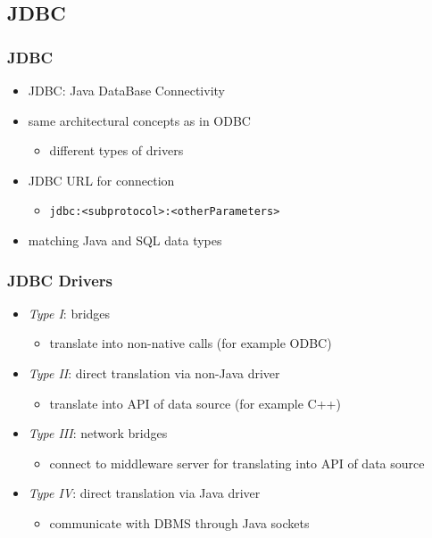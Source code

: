 \documentclass[dvipsnames]{beamer}
\theoremstyle{plain}
\begin{document}
\subsection{JDBC}

\begin{frame}
  \frametitle{JDBC}

  \begin{itemize}
    \item \alert{JDBC}: Java DataBase Connectivity

    \pause
    \item same architectural concepts as in ODBC
    \begin{itemize}
      \item different types of drivers
    \end{itemize}

    \pause
    \item JDBC URL for connection
    \begin{itemize}
      \item \lstinline!jdbc:<subprotocol>:<otherParameters>!
    \end{itemize}

    \pause
    \item matching Java and SQL data types
  \end{itemize}
\end{frame}

\begin{frame}
  \frametitle{JDBC Drivers}

  \begin{itemize}
    \item \emph{Type I}: bridges
    \begin{itemize}
      \item translate into non-native calls (for example ODBC)
    \end{itemize}

    \pause
    \item \emph{Type II}: direct translation via non-Java driver
    \begin{itemize}
      \item translate into API of data source (for example C++)
    \end{itemize}

    \pause
    \item \emph{Type III}: network bridges
    \begin{itemize}
      \item connect to middleware server for translating into API of data source
    \end{itemize}

    \pause
    \item \emph{Type IV}: direct translation via Java driver
    \begin{itemize}
      \item communicate with DBMS through Java sockets
    \end{itemize}
  \end{itemize}
\end{frame}
\end{document}
